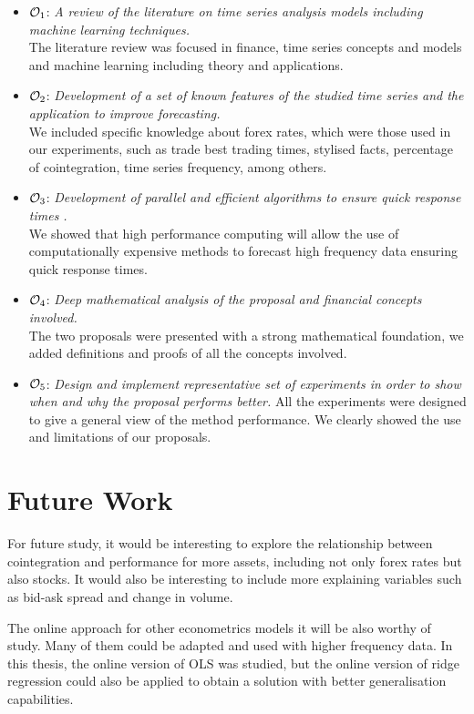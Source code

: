 \begin{itemize}
\item $\Large \mathcal{O}_1$: \emph{A review of the literature on time series
analysis models including machine learning techniques.}\\
The literature review was focused in finance, time series concepts and models and machine learning including theory and applications.
\item $\Large \mathcal{O}_2$: \emph{Development of a set of known features of the
studied time series and the application to improve forecasting.} \\
We included specific knowledge about forex rates, which were those used in our experiments, such as trade best trading times, stylised facts, percentage of cointegration, time series frequency, among others.
\item $\Large \mathcal{O}_3$: \emph{Development of parallel and efficient
algorithms to ensure quick response times .} \\
We showed that high performance computing will allow the use of computationally expensive methods to forecast high frequency data ensuring quick response times.
\item $\Large \mathcal{O}_4$: \emph{Deep mathematical analysis of the proposal
and financial concepts involved.} \\
The two proposals were presented with a strong mathematical foundation, we added definitions and proofs of all the concepts involved.
\item $\Large \mathcal{O}_5$: \emph{Design and implement representative set of
experiments in order to show when and why the proposal performs better.}
All the experiments were designed to give a general view of the method performance. We clearly showed the use and limitations of our proposals.
\end{itemize}


\section{Future Work}

For future study, it would be interesting to explore the relationship between
cointegration and performance for more assets, including not only forex rates
but also stocks. It would also be interesting to include more explaining
variables such as bid-ask spread and change in volume.

The online approach for other econometrics models it will be also worthy of 
study. Many of them could be adapted and used with higher frequency data. In
this thesis, the online version of OLS was studied, but the online version of
ridge regression could also be applied to obtain a solution with better
generalisation capabilities.

